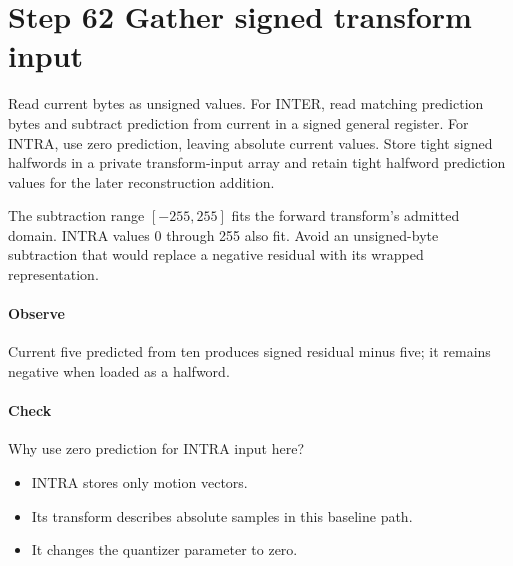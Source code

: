 \section{Step 62 Gather signed transform input}\label{h263-block-s02}
Read current bytes as unsigned values. For INTER, read matching prediction bytes
and subtract prediction from current in a signed general register. For INTRA,
use zero prediction, leaving absolute current values. Store tight signed halfwords
in a private transform-input array and retain tight halfword prediction values
for the later reconstruction addition.

The subtraction range $[-255,255]$ fits the forward transform's admitted domain.
INTRA values 0 through 255 also fit. Avoid an unsigned-byte subtraction that
would replace a negative residual with its wrapped representation.

\paragraph{Observe} Current five predicted from ten produces signed residual
minus five; it remains negative when loaded as a halfword.
\paragraph{Check} Why use zero prediction for INTRA input here?
\begin{itemize}
  \item[A.] INTRA stores only motion vectors.
  \item[B.] Its transform describes absolute samples in this baseline path.
  \item[C.] It changes the quantizer parameter to zero.
\end{itemize}
